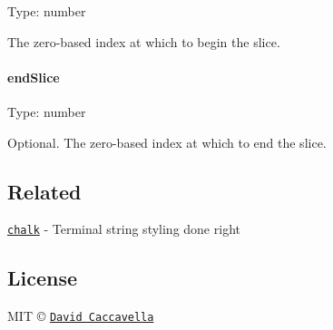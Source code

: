 Type\+: {\ttfamily number}

The zero-\/based index at which to begin the slice.

\paragraph*{end\+Slice}

Type\+: {\ttfamily number}

Optional. The zero-\/based index at which to end the slice.

\subsection*{Related}


\begin{DoxyItemize}
\item \href{https://github.com/chalk/chalk}{\tt chalk} -\/ Terminal string styling done right
\end{DoxyItemize}

\subsection*{License}

M\+IT © \href{https://githbu.com/dthree}{\tt David Caccavella} 